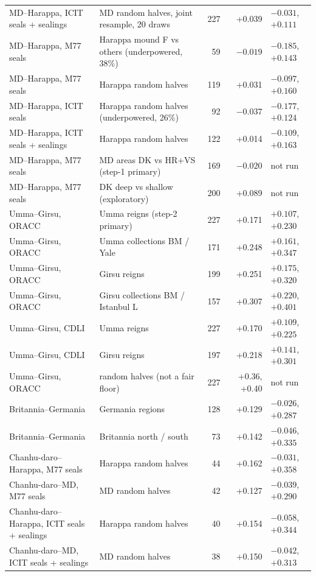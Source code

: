 \documentclass[11pt,a4paper]{article}
\begin{document}
\begin{table}[t]
\begin{tabularx}{\textwidth}{lXrrl}
MD--Harappa, ICIT seals + sealings & MD random halves, joint resample, 20 draws & 227 & +0.039 & $-0.031$, $+0.111$ \\ %
MD--Harappa, M77 seals & Harappa mound F vs others (underpowered, 38\%) & 59 & $-0.019$ & $-0.185$, $+0.143$ \\ %
MD--Harappa, M77 seals & Harappa random halves & 119 & +0.031 & $-0.097$, $+0.160$ \\ %
MD--Harappa, ICIT seals & Harappa random halves (underpowered, 26\%) & 92 & $-0.037$ & $-0.177$, $+0.124$ \\ %
MD--Harappa, ICIT seals + sealings & Harappa random halves & 122 & +0.014 & $-0.109$, $+0.163$ \\ %
MD--Harappa, M77 seals & MD areas DK vs HR+VS (step-1 primary) & 169 & $-0.020$ & not run \\ %
MD--Harappa, M77 seals & DK deep vs shallow (exploratory) & 200 & +0.089 & not run \\ %
\midrule
Umma--Girsu, ORACC & Umma reigns (step-2 primary) & 227 & +0.171 & $+0.107$, $+0.230$ \\ %
Umma--Girsu, ORACC & Umma collections BM / Yale & 171 & +0.248 & $+0.161$, $+0.347$ \\ %
Umma--Girsu, ORACC & Girsu reigns & 199 & +0.251 & $+0.175$, $+0.320$ \\ %
Umma--Girsu, ORACC & Girsu collections BM / Istanbul L & 157 & +0.307 & $+0.220$, $+0.401$ \\ %
Umma--Girsu, CDLI & Umma reigns & 227 & +0.170 & $+0.109$, $+0.225$ \\ %
Umma--Girsu, CDLI & Girsu reigns & 197 & +0.218 & $+0.141$, $+0.301$ \\ %
Umma--Girsu, ORACC & random halves (not a fair floor) & 227 & +0.36, +0.40 & not run \\ %
\midrule
Britannia--Germania & Germania regions & 128 & +0.129 & $-0.026$, $+0.287$ \\ %
Britannia--Germania & Britannia north / south & 73 & +0.142 & $-0.046$, $+0.335$ \\ %
\midrule
Chanhu-daro--Harappa, M77 seals & Harappa random halves & 44 & +0.162 & $-0.031$, $+0.358$ \\ %
Chanhu-daro--MD, M77 seals & MD random halves & 42 & +0.127 & $-0.039$, $+0.290$ \\ %
Chanhu-daro--Harappa, ICIT seals + sealings & Harappa random halves & 40 & +0.154 & $-0.058$, $+0.344$ \\ %
Chanhu-daro--MD, ICIT seals + sealings & MD random halves & 38 & +0.150 & $-0.042$, $+0.313$ \\ %
\bottomrule
\end{tabularx}
\end{table}
\end{document}
